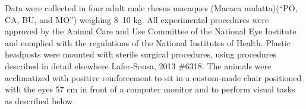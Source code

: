Data were collected in four adult male rhesus macaques (Macaca mulatta)(“PO, CA, BU, and MO”) weighing 8–10 kg. All experimental procedures were approved by the Animal Care and Use Committee of the National Eye Institute and complied with the regulations of the National Institutes of Health. Plastic headposts were mounted with sterile surgical procedures, using procedures described in detail elsewhere {Lafer-Sousa, 2013 \#6318}. The animals were acclimatized with positive reinforcement to sit in a custom-made chair positioned with the eyes 57 cm in front of a computer monitor and to perform visual tasks as described below. 